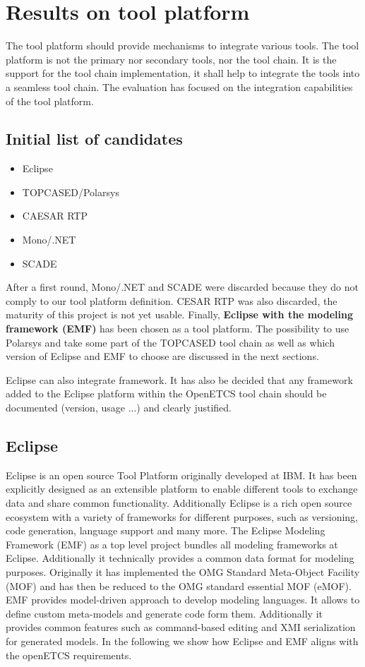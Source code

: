
\chapter{Results on tool platform}
\label{sec:platform}

The tool platform should provide mechanisms to integrate various
tools. The tool platform is not the primary nor secondary tools, nor
the tool chain. It is the support for the tool chain implementation,
it shall help to integrate the tools into a seamless tool chain.
The evaluation has focused on the integration capabilities of the tool platform.

\section{Initial list of candidates}
\begin{itemize}
\item Eclipse 
\item TOPCASED/Polarsys
\item CAESAR RTP
\item Mono/.NET 
\item SCADE
\end{itemize}

After a first round, Mono/.NET and SCADE were discarded because they do
not comply to our tool platform definition.  CESAR RTP was also
discarded, the maturity of this project is not yet usable. Finally,
{\bf Eclipse with the modeling framework (EMF)} has been chosen as a tool
platform. The possibility to use Polarsys and take some part of the
TOPCASED tool chain as well as which version of Eclipse  and EMF to choose are
discussed in the next sections.  

Eclipse can also integrate framework. It has also be decided that any
framework added to the Eclipse platform within the OpenETCS tool chain
should be documented (version, usage ...) and clearly justified.

\section{Eclipse}
Eclipse is an open source Tool Platform originally developed at
IBM. It has been explicitly designed as an extensible platform to
enable different tools to exchange data and share common
functionality. Additionally Eclipse is a rich open source ecosystem
with a variety of frameworks for different purposes, such as
versioning, code generation, language support and many more. The
Eclipse Modeling Framework (EMF) as a top level project bundles all
modeling frameworks at Eclipse. Additionally it technically provides a
common data format for modeling purposes. Originally it has
implemented the OMG Standard Meta-Object Facility (MOF) and has then
be reduced to the OMG standard essential MOF (eMOF). EMF provides
model-driven approach to develop modeling languages. It allows to
define custom meta-models and generate code form them. Additionally it
provides common features such as command-based editing and XMI
serialization for generated models. In the following we show how
Eclipse and EMF aligns with the openETCS requirements.

